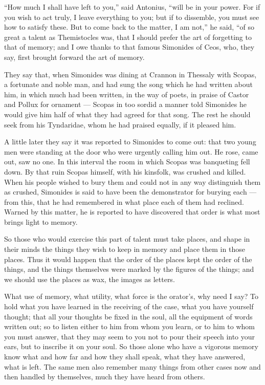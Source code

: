  ``How much I shall have left to you,'' said Antonius, ``will be in your power. For if you wish to act truly, I leave everything to you; but if to dissemble, you must see how to satisfy these. But to come back to the matter, I am not,'' he said, ``of so great a talent as Themistocles was, that I should prefer the art of forgetting to that of memory; and I owe thanks to that famous Simonides of Ceos, who, they say, first brought forward the art of memory.

 They say that, when Simonides was dining at Crannon in Thessaly with Scopas, a fortunate and noble man, and had sung the song which he had written about him, in which much had been written, in the way of poets, in praise of Castor and Pollux for ornament — Scopas in too sordid a manner told Simonides he would give him half of what they had agreed for that song. The rest he should seek from his Tyndaridae, whom he had praised equally, if it pleased him.

 A little later they say it was reported to Simonides to come out: that two young men were standing at the door who were urgently calling him out. He rose, came out, saw no one. In this interval the room in which Scopas was banqueting fell down. By that ruin Scopas himself, with his kinsfolk, was crushed and killed. When his people wished to bury them and could not in any way distinguish them as crushed, Simonides is said to have been the demonstrator for burying each — from this, that he had remembered in what place each of them had reclined. Warned by this matter, he is reported to have discovered that order is what most brings light to memory.

 So those who would exercise this part of talent must take places, and shape in their minds the things they wish to keep in memory and place them in those places. Thus it would happen that the order of the places kept the order of the things, and the things themselves were marked by the figures of the things; and we should use the places as wax, the images as letters.

 What use of memory, what utility, what force is the orator's, why need I say? To hold what you have learned in the receiving of the case, what you have yourself thought; that all your thoughts be fixed in the soul, all the equipment of words written out; so to listen either to him from whom you learn, or to him to whom you must answer, that they may seem to you not to pour their speech into your ears, but to inscribe it on your soul. So those alone who have a vigorous memory know what and how far and how they shall speak, what they have answered, what is left. The same men also remember many things from other cases now and then handled by themselves, much they have heard from others.

